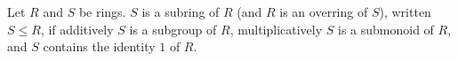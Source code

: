 Let $R$ and $S$ be rings. $S$ is a subring of $R$ (and $R$ is an overring of $S$), written $S \leq R$, if additively $S$ is a subgroup of $R$, multiplicatively $S$ is a submonoid of $R$, and $S$ contains the identity $1$ of $R$.
